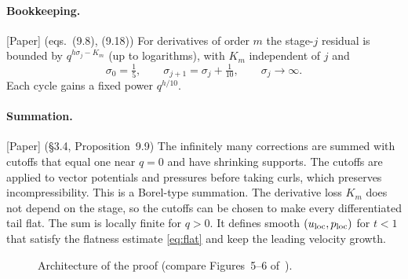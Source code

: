\documentclass[11pt]{article}
\theoremstyle{plain}
\theoremstyle{remark}
\newcommand{\paper}{\textsf{\small[Paper]}}
\begin{document}
\paragraph{Bookkeeping.} \paper{} (eqs.~(9.8), (9.18)) For derivatives of order $m$ the stage-$j$ residual is bounded by $q^{h\sigma_j-K_m}$ (up to logarithms), with $K_m$ independent of $j$ and
\[
\sigma_0=\tfrac15,\qquad\sigma_{j+1}=\sigma_j+\tfrac1{10},\qquad\sigma_j\to\infty .
\]
Each cycle gains a fixed power $q^{h/10}$.

\paragraph{Summation.} \paper{} (\S3.4, Proposition~9.9) The infinitely many corrections are summed with cutoffs that equal one near $q=0$ and have shrinking supports. The cutoffs are applied to vector potentials and pressures before taking curls, which preserves incompressibility. This is a Borel-type summation. The derivative loss $K_m$ does not depend on the stage, so the cutoffs can be chosen to make every differentiated tail flat. The sum is locally finite for $q>0$. It defines smooth $(u_{\rm loc},p_{\rm loc})$ for $t<1$ that satisfy the flatness estimate \eqref{eq:flat} and keep the leading velocity growth.

\begin{figure}[h]
\centering
{}
\caption{Architecture of the proof (compare Figures~5--6 of~\cite{OAI}).}
\end{figure}
\end{document}
